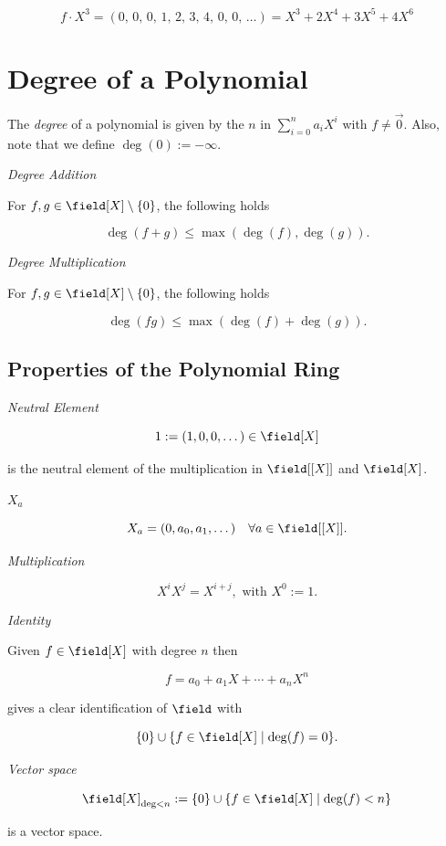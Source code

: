 \[
    f \cdot X^{3} = (0,\,0,\,0,\,1,\,2,\,3,\,4,\,0,\,0,\,\ldots) = X^{3} + 2X^{4} + 3X^{5} + 4X^{6}
\]

\section{Degree of a Polynomial}

The \emph{degree} of a polynomial is given by the \(n\) in \(\sum_{i = 0}^{n} a_i X^i\) with \(f \ne \vec{0}\).
Also, note that we define \(\deg(0):= -\infty\).

\emph{Degree Addition}

For \(f,g \in \field[X] \setminus \{0\}\), the following holds 

\[
    \deg(f + g) \le \max(\deg(f),\deg(g)).
\]

\emph{Degree Multiplication}

For \(f,g \in \field[X] \setminus \{0\}\), the following holds 

\[
    \deg(fg) \le \max(\deg(f) + \deg(g)).
\]

\subsection{Properties of the Polynomial Ring}

\emph{Neutral Element}

\[
    1 := (1, 0, 0, \dots) \in \field[X]
\]

is the neutral element of the multiplication in \(\field[[X]]\) and \(\field[X]\).

\emph{\(X_a\)}

\[
    X_a = (0, a_0, a_1, \dots) \quad \forall a \in \field [[X]].
\]

\emph{Multiplication}

\[
    X^i X^j = X^{i + j}, \text{ with } X^0 := 1.
\]

\emph{Identity}

Given \(f \in \field[X]\) with degree \(n\) then 

\[
    f = a_0 + a_1 X + \cdots + a_n X^n
\]

gives a clear identification of \(\field\) with 

\[
    \{0\} \cup \{f \in \field [X] \mid \deg(f) = 0\}.
\]

\emph{Vector space}

\[
    \field[X]_{\deg < n} := \{0\} \cup \{f \in \field [X] \mid \deg(f) < n\}
\]

is a vector space.



